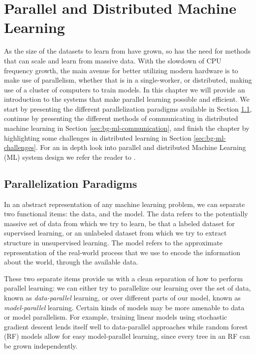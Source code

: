 \chapter{Parallel and Distributed Machine Learning}
\label{ch:bg-parallel-ml}

As the size of the datasets to learn from have grown, so has the need for methods that
can scale and learn from massive data. With the slowdown of CPU frequency
growth, the main avenue for better utilizing modern hardware is to make use
of parallelism, whether that is in a single-worker, or distributed,
making use of a cluster of computers to train models. In this chapter we
will provide an introduction to the systems that make
parallel learning possible and efficient. We start by presenting the
different parallelization paradigms available in Section \ref{sec:bg-ml-paradigms},
continue by presenting the different methods of communicating in
distributed machine learning in Section \ref{sec:bg-ml-communication},
and finish the chapter by highlighting some challenges in
distributed learning in Section \ref{sec:bg-ml-challenges}.
For an in depth look into parallel and distributed Machine Learning (ML)
system design we refer the reader to \cite{distributed-ml-design}.

\section{Parallelization Paradigms}
\label{sec:bg-ml-paradigms}

In an abstract representation of any machine learning problem, we can separate
two functional items: the data, and the model. The data refers to the potentially
massive set of data from which we try to learn, be that a labeled dataset for
supervised learning, or an unlabeled dataset from which we try to extract
structure in unsupervised learning. The model refers to the approximate representation
of the real-world process that we use to encode the information about the world,
through the available data.

These two separate items provide us with a clean separation of how to perform
parallel learning: we can either try to parallelize our learning over the set
of data, known as \emph{data-parallel} learning, or over different parts of
our model, known as \emph{model-parallel} learning. Certain kinds of models
may be more amenable to data or model parallelism. For example, training
linear models using stochastic gradient descent lends itself well to
data-parallel approaches \cite{dekel-optimal-distributed} while random
forest (RF) models allow for easy model-parallel learning,
since every tree in an RF can be grown independently.

